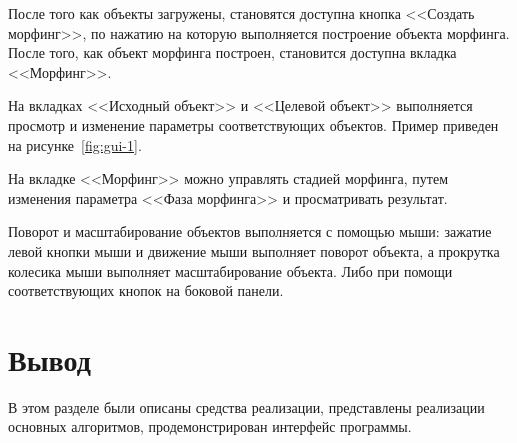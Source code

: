 После того как объекты загружены, становятся доступна кнопка <<Создать морфинг>>, по нажатию на которую выполняется построение объекта морфинга. После того, как объект морфинга построен, становится доступна вкладка <<Морфинг>>.

На вкладках <<Исходный объект>> и <<Целевой объект>> выполняется просмотр и изменение параметры соответствующих объектов. Пример приведен на рисунке~\ref{fig:gui-1}.

На вкладке <<Морфинг>> можно управлять стадией морфинга, путем изменения параметра <<Фаза морфинга>> и просматривать результат.

Поворот и масштабирование объектов выполняется с помощью мыши: зажатие левой кнопки мыши и движение мыши выполняет поворот объекта, а прокрутка колесика мыши выполняет масштабирование объекта. Либо при помощи соответствующих кнопок на боковой панели.


\section*{Вывод}
В этом разделе были описаны средства реализации, представлены реализации основных алгоритмов, продемонстрирован интерфейс программы.
\clearpage